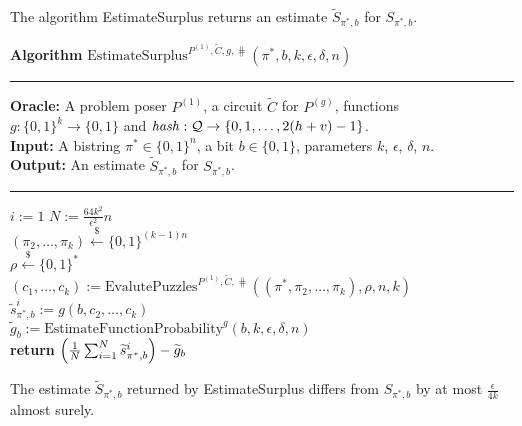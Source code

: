 The algorithm EstimateSurplus returns an estimate $\widetilde{S}_{\pi^*, b}$ for $S_{\pi^*, b}$.
%
\begin{codeblock}
  \textbf{Algorithm} $\text{EstimateSurplus}^{P^{(1)}, \widetilde{C}, g, \hash}(\pi^*, b, k, \epsilon, \delta, n)$
  \medskip\hrule
  \textbf{Oracle:} A problem poser $P^{(1)}$, a circuit $\widetilde{C}$ for $P^{(g)}$, functions \\
  \IndII $g: \{0,1\}^{k} \rightarrow \{0,1\}$ and  $\operatorname{\mathit{hash}} : \mathcal{Q} \rightarrow \{0,1,\dots, 2(h+v)-1\}$.\\
  \textbf{Input:} A bistring $\pi^* \in \{0,1\}^{n}$, a bit $b \in \{0,1\}$, parameters $k$, $\epsilon$, $\delta$, $n$.\\
  \textbf{Output:} An estimate $\widetilde{S}_{\pi^*, b}$ for $S_{\pi^*, b}$.
  \medskip\hrule
  \For $i:=1$ \To $N := \frac{64k^2}{\epsilon^2}n$ \Do \\
  \IndI $(\pi_{2}, \dots, \pi_k) \xleftarrow{\$} \{0,1\}^{(k-1)n}$\\
  \IndI $\rho \xleftarrow{\$} \{0,1\}^{*}$\\
  \IndI $(c_1, \dots, c_k) := \text{EvalutePuzzles}^{P^{(1)}, \widetilde{C}, \hash}((\pi^*, \pi_2, \dots, \pi_k), \rho, n, k)$\\
  \IndI $\widetilde{s}_{\pi^*,b}^i := g(b, c_{2}, \dots, c_k)$\\
  $\widetilde{g}_b := \text{EstimateFunctionProbability}^{g}(b, k, \epsilon, \delta, n)$ \\
  \textbf{return} $\Bigl(\frac{1}{N} \sum_{i=1}^N \widetilde{s}_{\pi^*,b}^i \Bigr) - \widetilde{g}_b$
\end{codeblock}
%
\begin{lemma}
  \label{lemma:surplus_estimate}
The estimate $\widetilde{S}_{\pi^*,b}$ returned by EstimateSurplus differs from $S_{\pi^*, b}$ by at most $\frac{\epsilon}{4k}$ almost surely.
\end{lemma}

